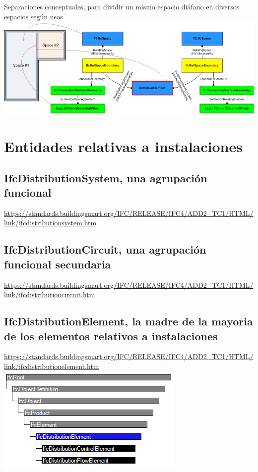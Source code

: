\documentclass[spanish,12pt,a4paper,final,oneside]{book}
\begin{document}
Separaciones conceptuales, para dividir un mismo espacio diáfano en diversos espacios según usos
\\ \includegraphics[width=\textwidth]{ifcvirtualelement_spaceboundaries}







\chapter{Entidades relativas a instalaciones}


\section{IfcDistributionSystem, una agrupación funcional}
\url{https://standards.buildingsmart.org/IFC/RELEASE/IFC4/ADD2_TC1/HTML/link/ifcdistributionsystem.htm}

\section{IfcDistributionCircuit, una agrupación funcional secundaria}
\url{https://standards.buildingsmart.org/IFC/RELEASE/IFC4/ADD2_TC1/HTML/link/ifcdistributioncircuit.htm}

\section{IfcDistributionElement, la madre de la mayoria de los elementos relativos a instalaciones}
\url{https://standards.buildingsmart.org/IFC/RELEASE/IFC4/ADD2_TC1/HTML/link/ifcdistributionelement.htm}
\\ \includegraphics[scale=1]{jerarquia de IfcDistributionElement}
\end{document}
